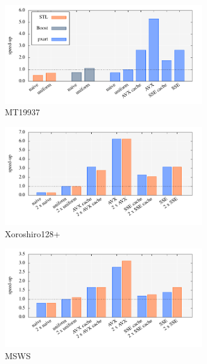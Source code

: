 \documentclass{stdlocal}
\begin{document}
    \begin{figure}
      \center
      \begin{subfigure}[b]{\textwidth}
        \includegraphics[width=0.95\textwidth]{plots/monte_carlo_pi_desktop_mt19937.pdf}
        \caption{MT19937}
      \end{subfigure}

      \begin{subfigure}[b]{\textwidth}
        \includegraphics[width=0.95\textwidth]{plots/monte_carlo_pi_desktop_xrsr128p.pdf}
        \caption{Xoroshiro128+}
      \end{subfigure}

      \begin{subfigure}[b]{\textwidth}
        \includegraphics[width=0.95\textwidth]{plots/monte_carlo_pi_desktop_msws.pdf}
        \caption{MSWS}
      \end{subfigure}
      \caption{}
    \end{figure}
\end{document}
